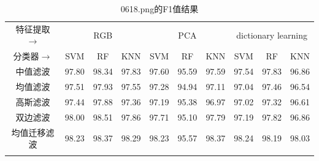 \documentclass[12pt,hyperref,a4paper,UTF8]{ctexart}
\begin{document}
{%
\begin{table}[!h]
	\centering
	\caption{0618.png的F1值结果}
	\label{tab:f10618}
	\begin{tabular}{@{}clllllllll@{}}
		\hline
		特征提取$\rightarrow$    & \multicolumn{3}{c}{RGB}                                                    & \multicolumn{3}{c}{PCA}                                                    & \multicolumn{3}{c}{dictionary learning}                                    \\
		分类器$\rightarrow$     & \multicolumn{1}{c}{SVM} & \multicolumn{1}{c}{RF} & \multicolumn{1}{c}{KNN} & \multicolumn{1}{c}{SVM} & \multicolumn{1}{c}{RF} & \multicolumn{1}{c}{KNN} & \multicolumn{1}{c}{SVM} & \multicolumn{1}{c}{RF} & \multicolumn{1}{c}{KNN} \\
		\hline
		中值滤波                 & 97.80                   & 98.34                  & 97.83                   & 97.60                   & 95.59                  & 97.59                   & 97.54                   & 97.83                  & 96.86                   \\
		均值滤波                 & 97.51                   & 97.93                  & 97.55                   & 97.28                   & 94.94                  & 97.11                   & 97.04                   & 97.46                  & 96.54                   \\
		高斯滤波                 & 97.44                   & 97.88                  & 97.36                   & 97.19                   & 95.38                  & 96.97                   & 97.02                   & 97.32                  & 96.61                   \\
		双边滤波                 & 98.00                   & 98.51                  & 97.86                   & 97.71                   & 95.10                  & 97.79                   & 97.19                   & 97.82                  & 96.86                   \\
		均值迁移滤波               & 98.23                   & 98.37                  & 98.29                   & 98.23                   & 95.57                  & 98.37                   & 98.24                   & 98.19                  & 98.03                   \\
		\hline
		\multicolumn{1}{l}{} &                         &                        &                         &                         &                        &                         &                         &                        &                         \\

\end{tabular}
\end{table}}
\end{document}
